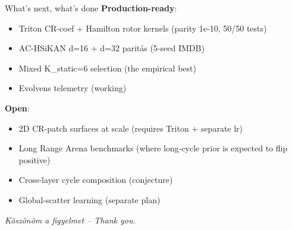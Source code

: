 \documentclass[aspectratio=169, 11pt]{beamer}
\begin{document}
\begin{frame}{What's next, what's done}
  \textbf{Production-ready}:
  \begin{itemize}
  \item Triton CR-coef + Hamilton rotor kernels (parity 1e-10, 50/50 tests)
  \item AC-HSiKAN d=16 + d=32 parit\'as (5-seed IMDB)
  \item Mixed K\_static=6 selection (the empirical best)
  \item Evolvens telemetry (working)
  \end{itemize}

  \vspace{2mm}
  \textbf{Open}:
  \begin{itemize}
  \item 2D CR-patch surfaces at scale (requires Triton + separate lr)
  \item Long Range Arena benchmarks (where long-cycle prior is expected
        to flip positive)
  \item Cross-layer cycle composition (conjecture)
  \item Global-scatter learning (separate plan)
  \end{itemize}

  \vspace{4mm}
  \begin{center}
  \large \textit{Köszönöm a figyelmet -- Thank you.}
  \end{center}
\end{frame}
\end{document}
